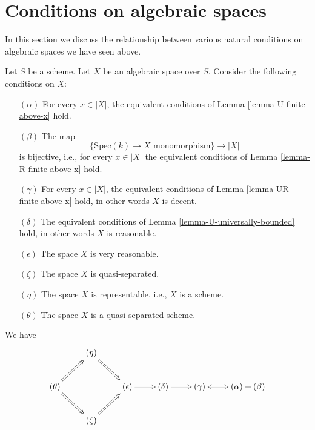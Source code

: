 \section{Conditions on algebraic spaces}
\label{section-conditions}

\noindent
In this section we discuss the relationship between various natural
conditions on algebraic spaces we have seen above.

\begin{lemma}
\label{lemma-bounded-fibres}
Let $S$ be a scheme. Let $X$ be an algebraic space over $S$.
Consider the following conditions on $X$:
\begin{enumerate}
\item[$(\alpha)$] For every $x \in |X|$, the equivalent conditions of
Lemma \ref{lemma-U-finite-above-x} hold.
\item[$(\beta)$] The map
$$
\{\text{Spec}(k) \to X \text{ monomorphism}\}
\longrightarrow
|X|
$$
is bijective, i.e., for every $x \in |X|$ the equivalent conditions of
Lemma \ref{lemma-R-finite-above-x} hold.
\item[$(\gamma)$] For every $x \in |X|$, the equivalent conditions of
Lemma \ref{lemma-UR-finite-above-x} hold, in other words $X$ is decent.
\item[$(\delta)$] The equivalent conditions of
Lemma \ref{lemma-U-universally-bounded} hold, in other words $X$ is reasonable.
\item[$(\epsilon)$] The space $X$ is very reasonable.
\item[$(\zeta)$] The space $X$ is quasi-separated.
\item[$(\eta)$] The space $X$ is representable, i.e., $X$ is a scheme.
\item[$(\theta)$] The space $X$ is a quasi-separated scheme.
\end{enumerate}
We have
$$
\xymatrix{
& (\eta) \ar@{=>}[rd] & & & &  \\
(\theta) \ar@{=>}[ru] \ar@{=>}[rd] & & 
(\epsilon) \ar@{=>}[r] &
(\delta) \ar@{=>}[r] &
(\gamma) \ar@{<=>}[r] & (\alpha) + (\beta) \\
& (\zeta) \ar@{=>}[ru] & & & & 
}
$$
\end{lemma}

